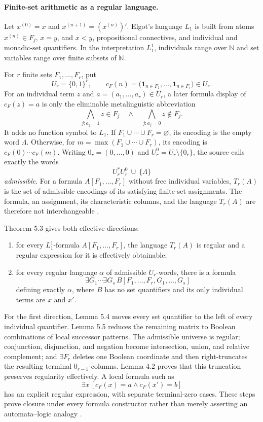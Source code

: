 \paragraph{Finite-set arithmetic as a regular language.}
Let \(x^{(0)}=x\) and \(x^{(n+1)}=(x^{(n)})'\).  Elgot's language \(L_1\) is
built from atoms \(x^{(n)}\in F_j\), \(x=y\), and \(x<y\), propositional
connectives, and individual and monadic-set quantifiers.  In the interpretation
\(L_1^1\), individuals range over \(\mathbb N\) and set variables range over
finite subsets of \(\mathbb N\).

For \(r\) finite sets \(F_1,\ldots,F_r\), put
\[
 U_r=\{0,1\}^r,
 \qquad
 c_F(n)=
 \bigl(\mathbf 1_{n\in F_1},\ldots,
       \mathbf 1_{n\in F_r}\bigr)\in U_r.
\]
For an individual term \(z\) and
\(a=(a_1,\ldots,a_r)\in U_r\), a later formula display of
\(c_F(z)=a\) is only the eliminable metalinguistic abbreviation
\[
 \bigwedge_{j:a_j=1} z\in F_j
 \quad\land\quad
 \bigwedge_{j:a_j=0} z\notin F_j.
\]
It adds no function symbol to \(L_1\).
If \(F_1\cup\cdots\cup F_r=\varnothing\), its encoding is the empty word
\(\Lambda\).  Otherwise, for
\(m=\max(F_1\cup\cdots\cup F_r)\), its encoding is
\(c_F(0)\cdots c_F(m)\).  Writing
\(0_r=(0,\ldots,0)\) and \(U_r^0=U_r\setminus\{0_r\}\), the source calls
exactly the words
\[
 U_r^*U_r^0\ \cup\ \{\Lambda\}
\]
\emph{admissible}.  For a formula \(A[F_1,\ldots,F_r]\) without free
individual variables, \(T_r(A)\) is the set of admissible encodings of its
satisfying finite-set assignments.  The formula, an assignment, its
characteristic columns, and the language \(T_r(A)\) are therefore not
interchangeable \cite[pp.~26--27]{Elgot1961}.

Theorem 5.3 gives both effective directions:
\begin{enumerate}
\item for every \(L_1^1\)-formula \(A[F_1,\ldots,F_r]\), the language
  \(T_r(A)\) is regular and a regular expression for it is effectively
  obtainable;
\item for every regular language \(\alpha\) of admissible \(U_r\)-words, there
  is a formula
  \[
   \exists G_1\cdots\exists G_s\,B[F_1,\ldots,F_r,G_1,\ldots,G_s]
  \]
  defining exactly \(\alpha\), where \(B\) has no set quantifiers and its only
  individual terms are \(x\) and \(x'\).
\end{enumerate}
For the first direction, Lemma 5.4 moves every set quantifier to the left of
every individual quantifier.  Lemma 5.5 reduces the remaining matrix to Boolean
combinations of local successor patterns.  The admissible universe is regular;
conjunction, disjunction, and negation become intersection, union, and relative
complement; and \(\exists F_r\) deletes one Boolean coordinate and then
right-truncates the resulting terminal \(0_{r-1}\)-columns.  Lemma 4.2 proves
that this truncation preserves regularity effectively.  A local formula such as
\[
 \exists x\,[c_F(x)=a\land c_F(x')=b]
\]
has an explicit regular expression, with separate terminal-zero cases.  These
steps prove closure under every formula constructor rather than merely asserting
an automata--logic analogy \cite[pp.~25--30]{Elgot1961}.

